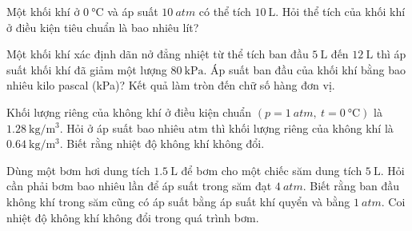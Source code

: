 \begin{ex}
	Một khối khí ở $\SI{0}{\celsius}$ và áp suất $\SI{10}{atm}$ có thể tích $\SI{10}{\liter}$. Hỏi thể tích của khối khí ở điều kiện tiêu chuẩn là bao nhiêu lít?
\end{ex}
\begin{ex}
	Một khối khí xác định dãn nở đẳng nhiệt từ thể tích ban đầu $\SI{5}{\liter}$ đến $\SI{12}{\liter}$ thì áp suất khối khí đã giảm một lượng $\SI{80}{\kilo\pascal}$. Áp suất ban đầu của khối khí bằng bao nhiêu kilo pascal (\si{\kilo\pascal})? Kết quả làm tròn đến chữ số hàng đơn vị.
\end{ex}
\begin{ex}
	Khối lượng riêng của không khí ở điều kiện chuẩn $\left(p=\SI{1}{atm},\ t=\SI{0}{\celsius}\right)$ là $\SI{1.28}{\kilogram/\meter^3}$. Hỏi ở áp suất bao nhiêu \si{atm} thì khối lượng riêng của không khí là $\SI{0.64}{\kilogram/\meter^3}$. Biết rằng nhiệt độ không khí không đổi.
\end{ex}
\begin{ex}
	Dùng một bơm hơi dung tích $\SI{1.5}{\liter}$ để bơm cho một chiếc săm dung tích $\SI{5}{\liter}$. Hỏi cần phải bơm bao nhiêu lần để áp suất trong săm đạt $\SI{4}{atm}$. Biết rằng ban đầu không khí trong săm cũng có áp suất bằng áp suất khí quyển và bằng $\SI{1}{atm}$. Coi nhiệt độ không khí không đổi trong quá trình bơm.
\end{ex}
